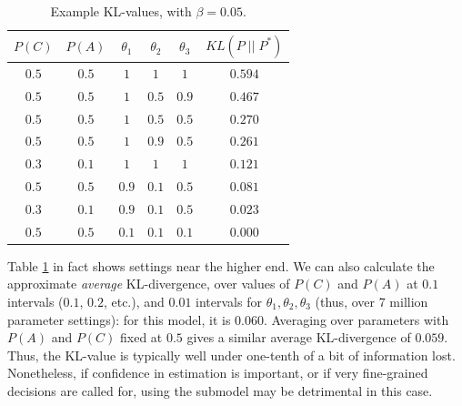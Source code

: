 \documentclass[10pt,letterpaper]{article}
\begin{document}
\begin{table}[h]  \begin{center}
\begin{tabular}{c | c | c | c | c || c}
 $P(C)$ & $P(A)$ & $\theta_1$ & $\theta_2$ & $\theta_3$ & $KL(P \;\vert\vert\; P^*)$ \\ \hline
 $0.5$ & $0.5$ & $1$ & $1$ & $1$  & $0.594$ \\
  $0.5$ & $0.5$ & $1$ & $0.5$ & $0.9$  & $0.467$ \\
  $0.5$ & $0.5$ &$1$ & $0.5$ & $0.5$  & $0.270$ \\
 $0.5$ & $0.5$ & $1$ & $0.9$ & $0.5$  & $0.261$ \\
  $0.3$ & $0.1$ & $1$ & $1$ & $1$ & $0.121$ \\
 $0.5$ & $0.5$ &  $0.9$ & $0.1$ & $0.5$  & $0.081$ \\
  $0.3$ & $0.1$ & $0.9$ & $0.1$ & $0.5$ & $0.023$ \\
 $0.5$ & $0.5$ & $0.1$ & $0.1$ & $0.1$ & $0.000$ 
\end{tabular} \end{center} \caption{Example KL-values, with $\beta = 0.05$.} \label{table1}
\end{table}
Table \ref{table1} in fact shows settings near the higher end. We can also calculate the approximate \emph{average} KL-divergence, over values of $P(C)$ and $P(A)$ at $0.1$ intervals ($0.1$, $0.2$, etc.), and $0.01$ intervals for $\theta_1,\theta_2,\theta_3$ (thus, over 7 million parameter settings): for this model, it is $0.060$. Averaging over parameters with $P(A)$ and $P(C)$ fixed at $0.5$ gives a similar average KL-divergence of $0.059$.
Thus, the KL-value is typically well under one-tenth of a bit of information lost.
Nonetheless, if confidence in estimation is important, or if very fine-grained decisions are called for, using the submodel may be detrimental in this case. 
\end{document}
